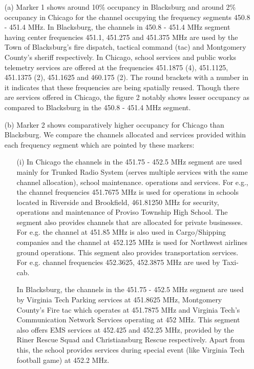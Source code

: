 \documentclass[12pt,sts]{report}
\begin{document}
		\begin{enumerate}
		
			\item[(a)] Marker 1 shows around 10\% occupancy in Blacksburg and around 2\% occupancy in Chicago for the channel occupying the frequency segments 450.8 - 451.4 MHz. In Blacksburg, the channels in 450.8 - 451.4 MHz segment having center frequencies 451.1, 451.275 and 451.375 MHz are used by the Town of Blacksburg's fire dispatch, tactical command (tac) and Montgomery County's sheriff respectively. In Chicago, school services and public works telemetry services are offered at the frequencies 451.1875 (4), 451.1125, 451.1375 (2), 451.1625 and 460.175 (2). The round brackets with a number in it indicates that these frequencies are being spatially reused.
			Though there are services offered in Chicago, the figure 2 notably shows lesser occupancy as compared to Blacksburg in the 450.8 - 451.4 MHz segment.
			
			\item[(b)] Marker 2 shows comparatively higher occupancy for Chicago than Blacksburg. We compare the channels allocated and services provided within each frequency segment which are pointed by these markers:
			
			\begin{enumerate}
				
				\item[(i)] In Chicago the channels in the 451.75 - 452.5 MHz segment are used mainly for Trunked Radio System (serves multiple services with the same channel allocation), school maintenance. operations and services. For e.g., the channel frequencies 451.7675 MHz is used for operations in schools located in Riverside and Brookfield, 461.81250 MHz for security, operations and maintenance of Proviso Township High School. The segment also provides channels that are allocated for private businesses. For e.g. the channel at 451.85 MHz is also used in Cargo/Shipping companies and the channel at 452.125 MHz is used for Northwest airlines ground operations. This segment also provides transportation services. For e.g. channel frequencies 452.3625, 452.3875 MHz  are used by Taxi-cab.
				
				In Blacksburg, the channels in the 451.75 - 452.5 MHz segment are used by Virginia Tech Parking services at 451.8625 MHz, Montgomery County's Fire tac which operates at 451.7875 MHz and Virginia Tech's Communication Network Services operating at 452 MHz. This segment also offers EMS services at 452.425 and 452.25 MHz, provided by the Riner Rescue Squad and Christiansburg Rescue respectively. Apart from this, the school provides services during special event (like Virginia Tech football game) at 452.2 MHz.
				

\end{enumerate}
\end{enumerate}
\end{document}
